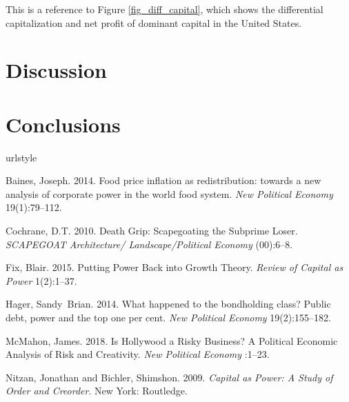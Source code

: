 \documentclass[12pt]{extarticle}
\begin{document}
This is a reference to Figure \ref{fig_diff_capital}, which shows the differential capitalization and net profit of dominant capital in the United States.




\section{Discussion}
\lipsum[1]

\begin{quote}
\lipsum[1]
\end{quote}

\section{Conclusions}
\lipsum[1]


\newpage

\begin{thebibliography}{6}
	\providecommand{\natexlab}[1]{#1}
	\expandafter\ifx\csname urlstyle\endcsname\relax
	\providecommand{\doi}[1]{doi:\discretionary{}{}{}#1}\else
	\providecommand{\doi}{doi:\discretionary{}{}{}\begingroup
		\urlstyle{rm}\Url}\fi
	
	Baines, Joseph. 2014.
	\newblock Food price inflation as redistribution: towards a new analysis of
	corporate power in the world food system.
	\newblock \emph{New Political Economy} 19(1):79--112.
	
	Cochrane, D.T. 2010.
	\newblock Death Grip: Scapegoating the Subprime Loser.
	\newblock \emph{SCAPEGOAT Architecture/ Landscape/Political Economy} (00):6--8.
	
	Fix, Blair. 2015.
	\newblock Putting Power Back into Growth Theory.
	\newblock \emph{Review of Capital as Power} 1(2):1--37.
	
	Hager, Sandy~Brian. 2014.
	\newblock What happened to the bondholding class? Public debt, power and the
	top one per cent.
	\newblock \emph{New Political Economy} 19(2):155--182.
	
	McMahon, James. 2018.
	\newblock Is {Hollywood} a Risky Business? A Political Economic Analysis of
	Risk and Creativity.
	\newblock \emph{New Political Economy} :1--23.
	
	Nitzan, Jonathan and Bichler, Shimshon. 2009.
	\newblock \emph{Capital as Power: A Study of Order and Creorder}.
	\newblock New York: Routledge.
	
\end{thebibliography}
\end{document}

